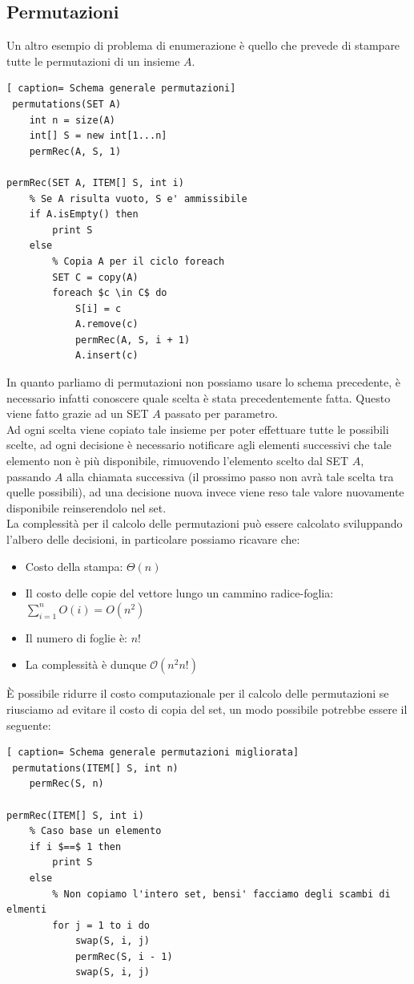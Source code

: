 \documentclass[../cheatSheetAlgoritmi.tex]{subfiles}
\begin{document}
\subsection{Permutazioni}
Un altro esempio di problema di enumerazione è quello che prevede di stampare tutte le permutazioni di un insieme $A$.
 \begin{lstlisting}[ caption= Schema generale permutazioni]
 permutations(SET A)
	int n = size(A)
	int[] S = new int[1...n]
	permRec(A, S, 1)

permRec(SET A, ITEM[] S, int i)
	% Se A risulta vuoto, S e' ammissibile
	if A.isEmpty() then
		print S
	else
		% Copia A per il ciclo foreach
		SET C = copy(A)
		foreach $c \in C$ do
			S[i] = c
			A.remove(c)
			permRec(A, S, i + 1)
			A.insert(c)
\end{lstlisting}
In quanto parliamo di permutazioni non possiamo usare lo schema precedente, è necessario infatti conoscere quale scelta è stata precedentemente fatta. Questo viene fatto grazie ad un SET $A$ passato per parametro. \\
Ad ogni scelta viene copiato tale insieme per poter effettuare tutte le possibili scelte, ad ogni decisione è necessario notificare agli elementi successivi che tale elemento non è più disponibile, rimuovendo l'elemento scelto dal SET $A$, passando $A$ alla chiamata successiva (il prossimo passo non avrà tale scelta tra quelle possibili), ad una decisione nuova invece viene reso tale valore nuovamente disponibile reinserendolo nel set. \\
La complessità per il calcolo delle permutazioni può essere calcolato sviluppando l'albero delle decisioni, in particolare possiamo ricavare che:
\begin{itemize}
	\item Costo della stampa: $\Theta(n)$
	\item Il costo delle copie del vettore lungo un cammino radice-foglia:
	$\sum_{i = 1}^{n} O(i) = O(n^2)$
	\item Il numero di foglie è: $n!$
	\item La complessità è dunque $\mathcal{O}(n^2n!)$
\end{itemize}
È possibile ridurre il costo computazionale per il calcolo delle permutazioni se riusciamo ad evitare il costo di copia del set, un modo possibile potrebbe essere il seguente:
 \begin{lstlisting}[ caption= Schema generale permutazioni migliorata]
 permutations(ITEM[] S, int n)
	permRec(S, n)

permRec(ITEM[] S, int i)
	% Caso base un elemento
	if i $==$ 1 then
		print S
	else
		% Non copiamo l'intero set, bensi' facciamo degli scambi di elmenti
		for j = 1 to i do
			swap(S, i, j)
			permRec(S, i - 1)
			swap(S, i, j)
\end{lstlisting}
\end{document}

